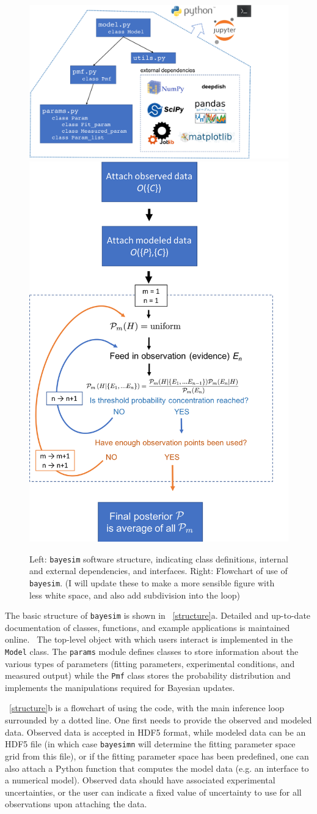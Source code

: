 \documentclass[aps,prl,amsmath,amssymb,superscriptaddress,notitlepage,groupedaddress]{revtex4-1}
\begin{document}
  \begin{figure}
    \includegraphics[width=0.55\columnwidth]{structure.png}
    \includegraphics[width=0.4\columnwidth]{flowchart.png}
    \caption{Left: \texttt{bayesim} software structure, indicating class definitions, internal and external dependencies, and interfaces. Right: Flowchart of use of \texttt{bayesim}. (I will update these to make a more sensible figure with less white space, and also add subdivision into the loop)}
    \label{structure}
  \end{figure}

  The basic structure of \texttt{bayesim} is shown in ~\autoref{structure}a. Detailed and up-to-date documentation of classes, functions, and example applications is maintained online.~\cite{docs} The top-level object with which users interact is implemented in the \texttt{Model} class. The \texttt{params} module defines classes to store information about the various types of parameters (fitting parameters, experimental conditions, and measured output) while the \texttt{Pmf} class stores the probability distribution and implements the manipulations required for Bayesian updates.

  ~\autoref{structure}b is a flowchart of using the code, with the main inference loop surrounded by a dotted line. One first needs to provide the observed and modeled data. Observed data is accepted in HDF5 format, while modeled data can be an HDF5 file (in which case \texttt{bayesimn} will determine the fitting parameter space grid from this file), or if the fitting parameter space has been predefined, one can also attach a Python function that computes the model data (e.g. an interface to a numerical model). Observed data should have associated experimental uncertainties, or the user can indicate a fixed value of uncertainty to use for all observations upon attaching the data.
\end{document}
